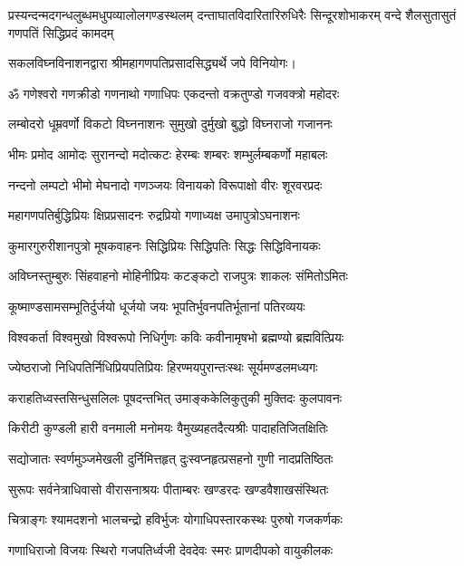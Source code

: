 {प्रस्यन्दन्मदगन्धलुब्धमधुपव्यालोलगण्डस्थलम्}
{दन्ताघातविदारितारिरुधिरैः सिन्दूरशोभाकरम्}
{वन्दे शैलसुतासुतं गणपतिं सिद्धिप्रदं कामदम्}

सकलविघ्नविनाशनद्वारा श्रीमहागणपतिप्रसादसिद्ध्यर्थे जपे विनियोगः।



\resetShloka
\twolineshloka
{ॐ गणेश्वरो गणक्रीडो गणनाथो गणाधिपः}
{एकदन्तो वक्रतुण्डो गजवक्त्रो महोदरः}

\twolineshloka
{लम्बोदरो धूम्रवर्णो विकटो विघ्ननाशनः}
{सुमुखो दुर्मुखो बुद्धो विघ्नराजो गजाननः}

\twolineshloka
{भीमः प्रमोद आमोदः सुरानन्दो मदोत्कटः}
{हेरम्बः शम्बरः शम्भुर्लम्बकर्णो महाबलः}

\twolineshloka
{नन्दनो लम्पटो भीमो मेघनादो गणञ्जयः}
{विनायको विरूपाक्षो वीरः शूरवरप्रदः}

\twolineshloka
{महागणपतिर्बुद्धिप्रियः क्षिप्रप्रसादनः}
{रुद्रप्रियो गणाध्यक्ष उमापुत्रोऽघनाशनः}

\twolineshloka
{कुमारगुरुरीशानपुत्रो मूषकवाहनः}
{सिद्धिप्रियः सिद्धिपतिः सिद्धः सिद्धिविनायकः}

\twolineshloka
{अविघ्नस्तुम्बुरुः सिंहवाहनो मोहिनीप्रियः}
{कटङ्कटो राजपुत्रः शाकलः संमितोऽमितः}

\twolineshloka
{कूष्माण्डसामसम्भूतिर्दुर्जयो धूर्जयो जयः}
{भूपतिर्भुवनपतिर्भूतानां पतिरव्ययः}

\twolineshloka
{विश्वकर्ता विश्वमुखो विश्वरूपो निधिर्गुणः}
{कविः कवीनामृषभो ब्रह्मण्यो ब्रह्मवित्प्रियः}

\twolineshloka
{ज्येष्ठराजो निधिपतिर्निधिप्रियपतिप्रियः}
{हिरण्मयपुरान्तःस्थः सूर्यमण्डलमध्यगः}

\twolineshloka
{कराहतिध्वस्तसिन्धुसलिलः पूषदन्तभित्}
{उमाङ्ककेलिकुतुकी मुक्तिदः कुलपावनः}

\twolineshloka
{किरीटी कुण्डली हारी वनमाली मनोमयः}
{वैमुख्यहतदैत्यश्रीः पादाहतिजितक्षितिः}

\twolineshloka
{सद्योजातः स्वर्णमुञ्जमेखली दुर्निमित्तहृत्}
{दुःस्वप्नहृत्प्रसहनो गुणी नादप्रतिष्ठितः}

\twolineshloka
{सुरूपः सर्वनेत्राधिवासो वीरासनाश्रयः}
{पीताम्बरः खण्डरदः खण्डवैशाखसंस्थितः}

\twolineshloka
{चित्राङ्गः श्यामदशनो भालचन्द्रो हविर्भुजः}
{योगाधिपस्तारकस्थः पुरुषो गजकर्णकः}

\twolineshloka
{गणाधिराजो विजयः स्थिरो गजपतिर्ध्वजी}
{देवदेवः स्मरः प्राणदीपको वायुकीलकः}

